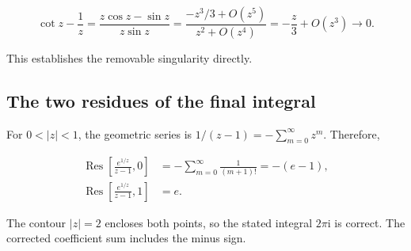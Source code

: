 \documentclass[11pt,a4paper]{article}
\theoremstyle{definition}
\theoremstyle{plain}
\begin{document}
\[
\cot z-\frac1z
=\frac{z\cos z-\sin z}{z\sin z}
=\frac{-z^3/3+O(z^5)}{z^2+O(z^4)}
=-\frac z3+O(z^3)\longrightarrow0.
\]

This establishes the removable singularity directly.

\subsection{The two residues of the final integral}

For $0<|z|<1$, the geometric series is $1/(z-1)=-\sum_{m=0}^{\infty}z^m$. Therefore,

\[
\begin{aligned}
\operatorname{Res}\left[\frac{e^{1/z}}{z-1},0\right]
&=-\sum_{m=0}^{\infty}\frac1{(m+1)!}=-(e-1),\\
\operatorname{Res}\left[\frac{e^{1/z}}{z-1},1\right]&=e.
\end{aligned}
\]

The contour $|z|=2$ encloses both points, so the stated integral $2\pi\mathrm{i}$ is correct. The corrected coefficient sum includes the minus sign.
\end{document}

